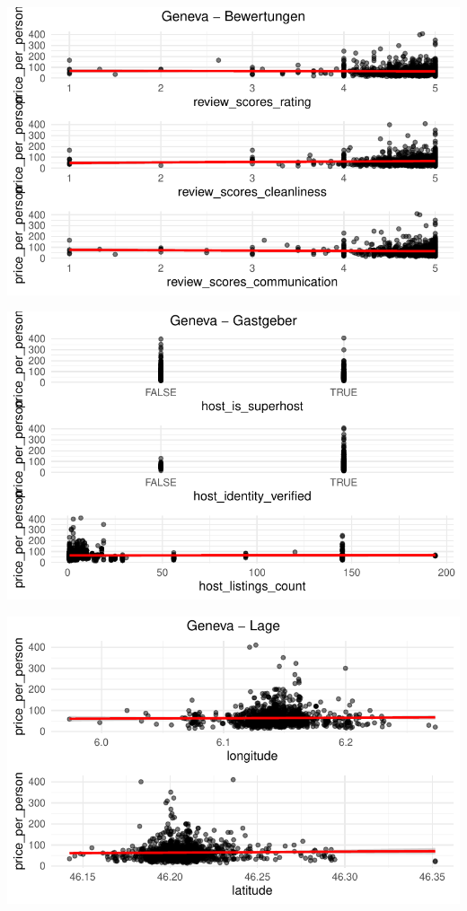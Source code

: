 \documentclass[
  journal,
]{IEEEtran}%
\begin{document}
\includegraphics{main_files/figure-pdf/unnamed-chunk-13-7.pdf}

\includegraphics{main_files/figure-pdf/unnamed-chunk-13-8.pdf}

\includegraphics{main_files/figure-pdf/unnamed-chunk-13-9.pdf}
\end{document}
